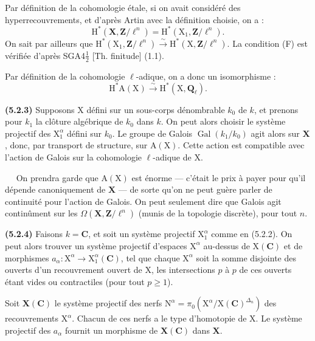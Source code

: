 \documentclass[11pt,leqno]{article}
\newcommand{\Page}[1]{\ifvmode\noindent\else\unskip\ \fi{\footnotesize\textcolor{gray}{[p.\,#1]}}\ \ignorespaces}
\begin{document}
Par définition de la cohomologie étale, si on avait considéré des hyperrecouvrements, et d’après Artin avec la définition choisie, on a :
\[
\mathrm{H}^*(\mathbf{X},\mathbf{Z}/\ell^n)
=\mathrm{H}^*(\mathrm{X}_1,\mathbf{Z}/\ell^n).
\]
On sait par ailleurs que \(\mathrm{H}^*(\mathrm{X}_1,\mathbf{Z}/\ell^n)\xrightarrow{\sim}\mathrm{H}^*(\mathrm{X},\mathbf{Z}/\ell^n)\). La condition (F) est vérifiée d’après SGA4\(\frac{1}{2}\) [Th. finitude] (1.1).

Par définition de la cohomologie \(\ell\)-adique, on a donc un isomorphisme :
\[
\mathrm{H}^*\mathrm{A}(\mathrm{X})
\xrightarrow{\sim}
\mathrm{H}^*(\mathrm{X},\mathbf{Q}_{\ell}).
\]

\textbf{(5.2.3)} Supposons \(\mathrm{X}\) défini sur un sous-corps dénombrable \(k_0\) de \(k\), et prenons pour \(k_1\) la clôture algébrique de \(k_0\) dans \(k\). On peut alors choisir le système projectif des \(\mathrm{X}_1^{\alpha}\) défini sur \(k_0\). Le groupe de Galois \(\operatorname{Gal}(k_1/k_0)\) agit alors sur \(\mathbf{X}\), donc, par transport de structure, sur \(\mathrm{A}(\mathrm{X})\). Cette action est compatible avec l’action de Galois sur la cohomologie \(\ell\)-adique de \(\mathrm{X}\).

\Page{239}
On prendra garde que \(\mathrm{A}(\mathrm{X})\) est énorme — c’était le prix à payer pour qu’il dépende canoniquement de \(\mathbf{X}\) — de sorte qu’on ne peut guère parler de continuité pour l’action de Galois. On peut seulement dire que Galois agit continûment sur les \(\Omega(\mathbf{X},\mathbf{Z}/\ell^n)\) (munis de la topologie discrète), pour tout \(n\).

\textbf{(5.2.4)} Faisons \(k=\mathbf{C}\), et soit un système projectif \(\mathrm{X}_1^{\alpha}\) comme en (5.2.2). On peut alors trouver un système projectif d’espaces \(\mathrm{X}^{\alpha}\) au-dessus de \(\mathrm{X}(\mathbf{C})\) et de morphismes \(a_{\alpha}:\mathrm{X}^{\alpha}\to\mathrm{X}_1^{\alpha}(\mathbf{C})\), tel que chaque \(\mathrm{X}^{\alpha}\) soit la somme disjointe des ouverts d’un recouvrement ouvert de \(\mathrm{X}\), les intersections \(p\) à \(p\) de ces ouverts étant vides ou contractiles (pour tout \(p\geq1\)).

Soit \(\mathbf{X}(\mathbf{C})\) le système projectif des nerfs \(\mathrm{N}^{\alpha}=\pi_0(\mathrm{X}^{\alpha}/\mathrm{X}(\mathbf{C})^{\Delta_n})\) des recouvrements \(\mathrm{X}^{\alpha}\). Chacun de ces nerfs a le type d’homotopie de \(\mathrm{X}\). Le système projectif des \(a_{\alpha}\) fournit un morphisme de \(\mathbf{X}(\mathbf{C})\) dans \(\mathbf{X}\).
\end{document}
